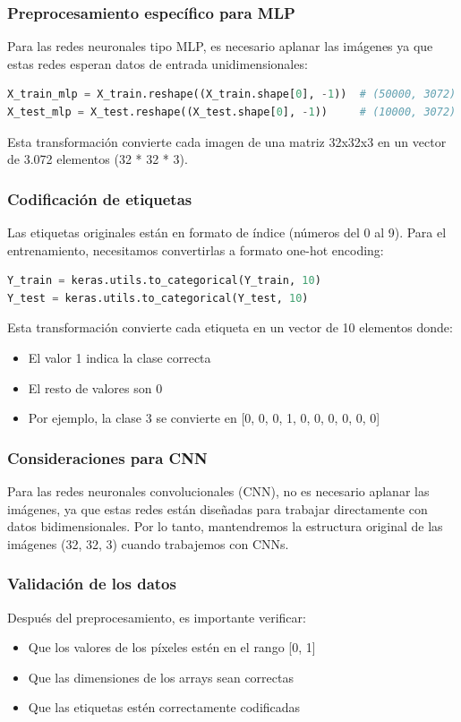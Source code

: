 \documentclass[11pt,a4paper]{article}
\begin{document}
\subsubsection{Preprocesamiento específico para MLP}
Para las redes neuronales tipo MLP, es necesario aplanar las imágenes ya que estas redes esperan datos de entrada unidimensionales:

\begin{lstlisting}[language=Python]
X_train_mlp = X_train.reshape((X_train.shape[0], -1))  # (50000, 3072)
X_test_mlp = X_test.reshape((X_test.shape[0], -1))     # (10000, 3072)
\end{lstlisting}

Esta transformación convierte cada imagen de una matriz 32x32x3 en un vector de 3.072 elementos (32 * 32 * 3).

\subsubsection{Codificación de etiquetas}
Las etiquetas originales están en formato de índice (números del 0 al 9). Para el entrenamiento, necesitamos convertirlas a formato one-hot encoding:

\begin{lstlisting}[language=Python]
Y_train = keras.utils.to_categorical(Y_train, 10)
Y_test = keras.utils.to_categorical(Y_test, 10)
\end{lstlisting}

Esta transformación convierte cada etiqueta en un vector de 10 elementos donde:
\begin{itemize}
    \item El valor 1 indica la clase correcta
    \item El resto de valores son 0
    \item Por ejemplo, la clase 3 se convierte en [0, 0, 0, 1, 0, 0, 0, 0, 0, 0]
\end{itemize}

\subsubsection{Consideraciones para CNN}
Para las redes neuronales convolucionales (CNN), no es necesario aplanar las imágenes, ya que estas redes están diseñadas para trabajar directamente con datos bidimensionales. Por lo tanto, mantendremos la estructura original de las imágenes (32, 32, 3) cuando trabajemos con CNNs.

\subsubsection{Validación de los datos}
Después del preprocesamiento, es importante verificar:
\begin{itemize}
    \item Que los valores de los píxeles estén en el rango [0, 1]
    \item Que las dimensiones de los arrays sean correctas
    \item Que las etiquetas estén correctamente codificadas
\end{itemize}
\end{document}
